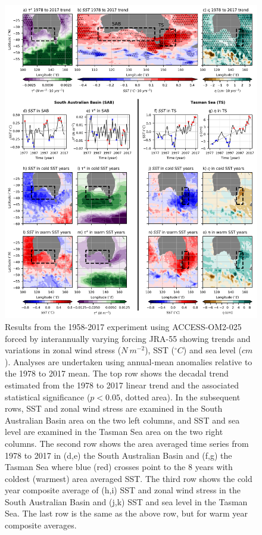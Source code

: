 \documentclass[draft,linenumbers]{agujournal2018}
\begin{document}
\begin{figure}[!h]
\centering
\includegraphics[trim={0 0.25cm 0 0},clip, width=1\textwidth]{c08_fig2_.png}
\caption{Results from the 1958-2017 experiment using ACCESS-OM2-025 forced by interannually varying forcing JRA-55 showing trends and variations in zonal wind stress ($N\ m^{-2}$), SST ($^{\circ}C$) and sea level ($cm$). Analyses are undertaken using annual-mean anomalies relative to the 1978 to 2017 mean. The top row shows the decadal trend estimated from the 1978 to 2017 linear trend and the associated statistical significance ($p < 0.05$, dotted area). In the subsequent rows, SST and zonal wind stress are examined in the South Australian Basin area on the two left columns, and SST and sea level are examined in the Tasman Sea area on the two right columns. The second row shows the area averaged time series from 1978 to 2017 in (d,e) the South Australian Basin and (f,g) the Tasman Sea where blue (red) crosses point to the 8 years with coldest (warmest) area averaged SST. The third row shows the cold year composite average of (h,i) SST and zonal wind stress in the South Australian Basin and (j,k) SST and sea level in the Tasman Sea. The last row is the same as the above row, but for warm year composite averages.}\label{c08_fig1_}
\end{figure}
\end{document}
